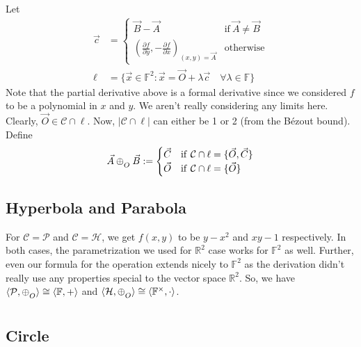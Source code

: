 \noindent
Let 
\begin{align*}
    \vec{c} &=
        \begin{cases}
            \vec{B}-\vec{A} & \mathrm{if}\ \vec{A}\neq\vec{B} \\
            \left(
                \frac{\partial f}{\partial y}, -\frac{\partial f}{\partial x}
            \right)_{(x,y)=\vec{A}} & \mathrm{otherwise}
        \end{cases} \\
    \ell &=
        \{\vec{x}\in\mathbb{F}^2:
        \vec{x} = \vec{O} + \lambda\vec{c}\quad\forall\lambda\in\mathbb{F}\}
\end{align*}
Note that the partial derivative above is a formal derivative since we considered
$f$ to be a polynomial in $x$ and $y$. We aren't really considering any limits
here. Clearly, $\vec{O}\in\mathcal{C}\cap\ell$. Now, $|\mathcal{C}\cap\ell|$ can
either be 1 or 2 (from the B\'ezout bound). Define
\[
    \vec{A} \conop \vec{B} :=
        \begin{cases}
            \vec{C} & \mathrm{if}\ \mathcal{C}\cap\ell = \{\vec{O},\vec{C}\} \\
            \vec{O} & \mathrm{if}\ \mathcal{C}\cap\ell = \{\vec{O}\} \\
        \end{cases}
\]

\subsection*{Hyperbola and Parabola}

For $\mathcal{C}=\mathcal{P}$ and $\mathcal{C}=\mathcal{H}$, we get $f(x,y)$ to be
$y - x^2$ and $xy - 1$ respectively. In both cases, the parametrization we used
for $\mathbb{R}^2$ case works for $\mathbb{F}^2$ as well. Further, even our
formula for the operation extends nicely to $\mathbb{F}^2$ as the derivation
didn't really use any properties special to the vector space $\mathbb{R}^2$. So,
we have $\langle\mathcal{P},\conop\rangle \cong \langle\mathbb{F},+\rangle$ and
$\langle\mathcal{H},\conop\rangle \cong \langle\mathbb{F}^\times,\cdot\rangle$.

\subsection*{Circle}

